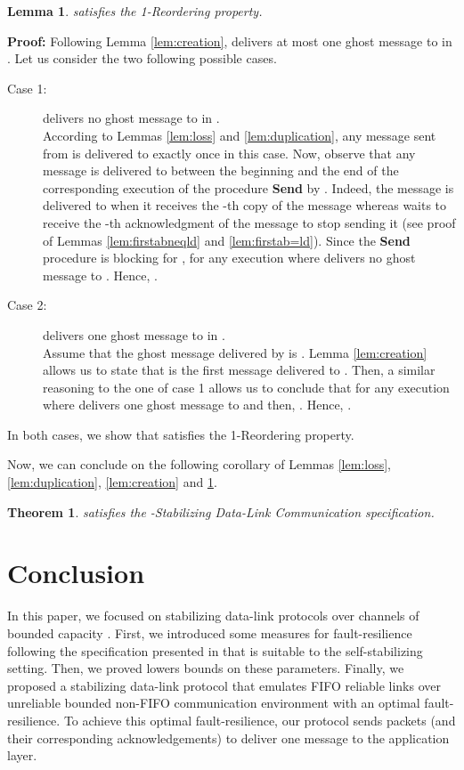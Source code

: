 \documentclass[11pt]{article}
\newtheorem{theorem}{Theorem}
\newtheorem{lemma}{Lemma}
\newenvironment{proof}{\noindent\textbf{Proof:}}{\hfill}
\begin{document}
\begin{lemma}\label{lem:reordering}
 satisfies the 1-Reordering property.
\end{lemma}

\begin{proof}
Following Lemma \ref{lem:creation},  delivers at most one ghost message to  in . Let us consider the two following possible cases.

\begin{description}
\item[Case 1:]  delivers no ghost message to  in .\\
According to Lemmas \ref{lem:loss} and \ref{lem:duplication}, any message sent from  is delivered to  exactly once in this case. Now, observe that any message is delivered to  between the beginning and the end of the corresponding execution of the procedure \textbf{Send} by . Indeed, the message is delivered to  when it receives the -th copy of the message whereas  waits to receive the -th acknowledgment of the message to stop sending it (see proof of Lemmas \ref{lem:firstabneqld} and \ref{lem:firstab=ld}). Since the \textbf{Send} procedure is blocking for ,  for any execution  where  delivers no ghost message to . Hence, .
\item[Case 2:]  delivers one ghost message to  in .\\
Assume that the ghost message delivered by  is . Lemma \ref{lem:creation} allows us to state that  is the first message delivered to . Then, a similar reasoning to the one of case 1 allows us to conclude that  for any execution  where  delivers one ghost message  to  and then, . Hence, .
\end{description}

In both cases, we show that  satisfies the 1-Reordering property.
\end{proof}

Now, we can conclude on the following corollary of Lemmas \ref{lem:loss}, \ref{lem:duplication}, \ref{lem:creation} and \ref{lem:reordering}.

\begin{theorem}
 satisfies the -Stabilizing Data-Link Communication specification.
\end{theorem}

\section{Conclusion}\label{sec:conclusion}

In this paper, we focused on stabilizing data-link protocols over channels of bounded capacity . First, we introduced some measures for fault-resilience following the specification presented in \cite{L96b} that is suitable to the self-stabilizing setting. Then, we proved lowers bounds on these parameters. Finally, we proposed a stabilizing data-link protocol that emulates FIFO reliable links over unreliable bounded non-FIFO communication environment with an optimal fault-resilience. To achieve this optimal fault-resilience, our protocol sends  packets (and their corresponding acknowledgements) to deliver one message to the application layer.
\end{document}
